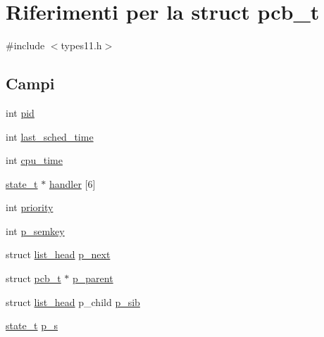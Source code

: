 \hypertarget{structpcb__t}{\section{Riferimenti per la struct pcb\-\_\-t}
\label{structpcb__t}
}


{\ttfamily \#include $<$types11.\-h$>$}

\subsection*{Campi}
\begin{DoxyCompactItemize}
\item 
int \hyperlink{structpcb__t_af500917c052066b40cf47f96b43c607b}{pid}
\item 
int \hyperlink{structpcb__t_aab19ac996ae189b600c68cb4e4e8b66b}{last\-\_\-sched\-\_\-time}
\item 
int \hyperlink{structpcb__t_a7438f6e4370c77335272481935c3c2da}{cpu\-\_\-time}
\item 
\hyperlink{structstate__t}{state\-\_\-t} $\ast$ \hyperlink{structpcb__t_aafb68b6d949df584f04372a411587a3e}{handler} \mbox{[}6\mbox{]}
\item 
int \hyperlink{structpcb__t_acec9ce2df15222151ad66fcb1d74eb9f}{priority}
\item 
int \hyperlink{structpcb__t_a831f803a73e91f4b1530e60bc24e92b4}{p\-\_\-semkey}
\item 
struct \hyperlink{structlist__head}{list\-\_\-head} \hyperlink{structpcb__t_adb25d84c36e53123e815e122610fd3ab}{p\-\_\-next}
\item 
struct \hyperlink{structpcb__t}{pcb\-\_\-t} $\ast$ \hyperlink{structpcb__t_a4d7a714ff6400c5cc2977964fc3b0c53}{p\-\_\-parent}
\item 
struct \hyperlink{structlist__head}{list\-\_\-head} p\-\_\-child \hyperlink{structpcb__t_ae571e01892f17d1ccf6332d96e6c5373}{p\-\_\-sib}
\item 
\hyperlink{structstate__t}{state\-\_\-t} \hyperlink{structpcb__t_ae1524fbfc37b7766b551477e48b3bf4d}{p\-\_\-s}
\end{DoxyCompactItemize}


